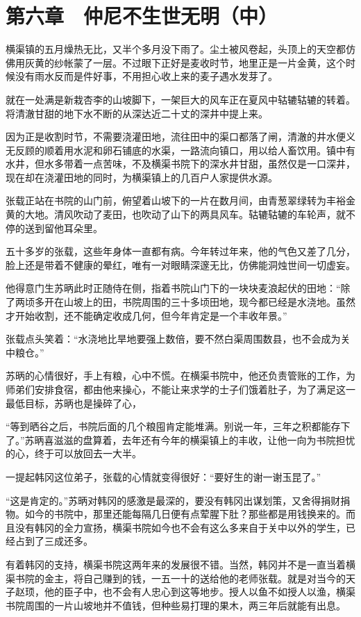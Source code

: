 \section{第六章　仲尼不生世无明（中）}

横渠镇的五月燥热无比，又半个多月没下雨了。尘土被风卷起，头顶上的天空都仿佛用灰黄的纱帐蒙了一层。不过眼下正好是麦收时节，地里正是一片金黄，这个时候没有雨水反而是件好事，不用担心收上来的麦子遇水发芽了。

就在一处满是新栽杏李的山坡脚下，一架巨大的风车正在夏风中轱辘轱辘的转着。将清澈甘甜的地下水不断的从深达近二十丈的深井中提上来。

因为正是收割时节，不需要浇灌田地，流往田中的渠口都落了闸，清澈的井水便义无反顾的顺着用水泥和卵石铺底的水渠，一路流向镇口，用以给人畜饮用。镇中有水井，但水多带着一点苦味，不及横渠书院下的深水井甘甜，虽然仅是一口深井，现在却在浇灌田地的同时，为横渠镇上的几百户人家提供水源。

张载正站在书院的山门前，俯望着山坡下的一片在数月间，由青葱翠绿转为丰裕金黄的大地。清风吹动了麦田，也吹动了山下的两具风车。轱辘轱辘的车轮声，就不停的送到留他耳朵里。

五十多岁的张载，这些年身体一直都有病。今年转过年来，他的气色又差了几分，脸上还是带着不健康的晕红，唯有一对眼睛深邃无比，仿佛能洞烛世间一切虚妄。

他得意门生苏昞此时正随侍在侧，指着书院山门下的一块块麦浪起伏的田地：“除了两顷多开在山坡上的田，书院周围的三十多顷田地，现今都已经是水浇地。虽然才开始收割，还不能确定收成几何，但今年肯定是一个丰收年景。”

张载点头笑着：“水浇地比旱地要强上数倍，要不然白渠周围数县，也不会成为关中粮仓。”

苏昞的心情很好，手上有粮，心中不慌。在横渠书院中，他还负责管账的工作，为师弟们安排食宿，都由他来操心，不能让来求学的士子们饿着肚子，为了满足这一最低目标，苏昞也是操碎了心，

“等到晒谷之后，书院后面的几个粮囤肯定能堆满。别说一年，三年之积都能存下了。”苏昞喜滋滋的盘算着，去年还有今年的横渠镇上的丰收，让他一向为书院担忧的心，终于可以放回去一大半。

一提起韩冈这位弟子，张载的心情就变得很好：“要好生的谢一谢玉昆了。”

“这是肯定的。”苏昞对韩冈的感激是最深的，要没有韩冈出谋划策，又舍得捐财捐物。如今的书院中，那里还能每隔几日便有点荤腥下肚？那些都是用钱换来的。而且没有韩冈的全力宣扬，横渠书院如今也不会有这么多来自于关中以外的学生，已经占到了三成还多。

有着韩冈的支持，横渠书院这两年来的发展很不错。当然，韩冈并不是一直当着横渠书院的金主，将自己赚到的钱，一五一十的送给他的老师张载。就是对当今的天子赵顼，他的臣子中，也不会有人忠心到这等地步。授人以鱼不如授人以渔，横渠书院周围的一片山坡地并不值钱，但种些易打理的果木，两三年后就能有出息。

